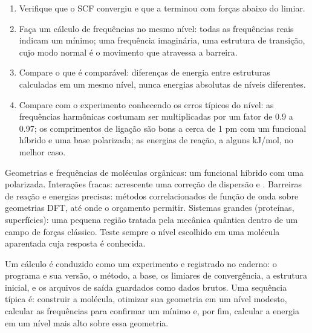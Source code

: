 \begin{method}\label{met:b3:computational-chemistry:read-calculation}
\begin{enumerate}
  \item Verifique que o SCF convergiu e que a  terminou
        com forças abaixo do limiar.
  \item Faça um cálculo de frequências no mesmo nível: todas as frequências
        reais indicam um mínimo; uma frequência imaginária, uma estrutura de
        transição, cujo modo normal é o movimento que atravessa a barreira.
  \item Compare o que é comparável: diferenças de energia entre estruturas
        calculadas em um mesmo nível, nunca energias absolutas de níveis diferentes.
  \item Compare com o experimento conhecendo os erros típicos do nível:
        as frequências harmônicas costumam ser multiplicadas por um fator de 0.9 a 0.97;
        os comprimentos de ligação são bons a cerca de 1 pm com um funcional híbrido e
        uma base polarizada; as energias de reação, a alguns \unit{kJ/mol}, no melhor caso.
\end{enumerate}
\end{method}

\begin{method}\label{met:b3:computational-chemistry:choose-level}
Geometrias e frequências de moléculas orgânicas: um funcional híbrido com uma
 polarizada. Interações fracas: acrescente uma
correção de dispersão e . Barreiras de reação e energias
precisas: métodos correlacionados de função de onda sobre geometrias DFT,
até onde o orçamento permitir. Sistemas grandes (proteínas, superfícies): uma
pequena região tratada pela mecânica quântica dentro de um campo de forças
clássico. Teste sempre o nível escolhido em uma molécula aparentada cuja
resposta é conhecida.
\end{method}

\begin{inthelab}
Um cálculo é conduzido como um experimento e registrado no caderno: o
programa e sua versão, o método, a base, os limiares de convergência, a
estrutura inicial, e os arquivos de saída guardados como dados brutos. Uma
sequência típica é: construir a molécula, otimizar sua geometria em um nível
modesto, calcular as frequências para confirmar um mínimo e, por fim,
calcular a energia em um nível mais alto sobre essa geometria.
\end{inthelab}

